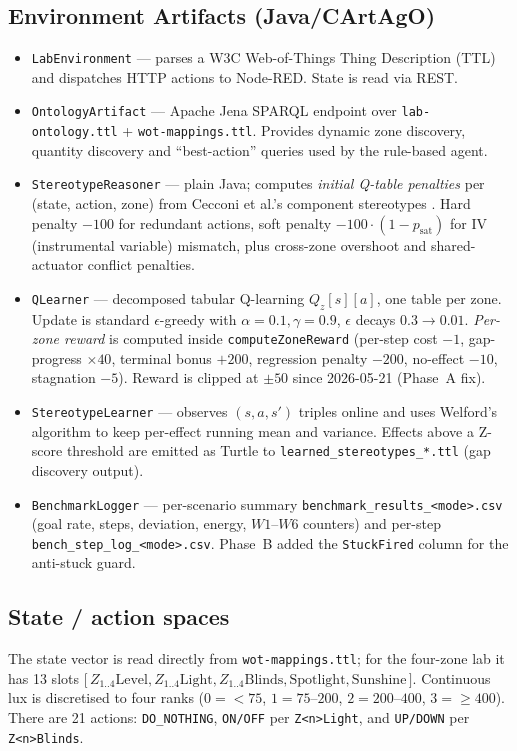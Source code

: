 \documentclass[conference]{IEEEtran}
\begin{document}
\subsection{Environment Artifacts (Java/CArtAgO)}
\begin{itemize}
  \item \texttt{LabEnvironment} --- parses a W3C Web-of-Things Thing
        Description (TTL) and dispatches HTTP actions to Node-RED.
        State is read via REST.
  \item \texttt{OntologyArtifact} --- Apache Jena SPARQL endpoint over
        \verb|lab-ontology.ttl| + \verb|wot-mappings.ttl|. Provides
        dynamic zone discovery, quantity discovery and ``best-action''
        queries used by the rule-based agent.
  \item \texttt{StereotypeReasoner} --- plain Java; computes
        \emph{initial Q-table penalties} per (state, action, zone)
        from Cecconi et al.'s component stereotypes
        \cite{cecconi2023}. Hard penalty $-100$ for redundant actions,
        soft penalty $-100\cdot(1-p_{\text{sat}})$ for IV (instrumental
        variable) mismatch, plus cross-zone overshoot and shared-actuator
        conflict penalties.
  \item \texttt{QLearner} --- decomposed tabular Q-learning
        \(Q_z[s][a]\), one table per zone. Update is standard
        $\epsilon$-greedy with $\alpha=0.1,\gamma=0.9$, $\epsilon$ decays
        $0.3 \to 0.01$. \emph{Per-zone reward} is computed inside
        \verb|computeZoneReward| (per-step cost $-1$, gap-progress
        $\times 40$, terminal bonus $+200$, regression penalty $-200$,
        no-effect $-10$, stagnation $-5$). Reward is clipped at
        $\pm 50$ since 2026-05-21 (Phase~A fix).
  \item \texttt{StereotypeLearner} --- observes
        $(s,a,s')$ triples online and uses Welford's algorithm to keep
        per-effect running mean and variance. Effects above a
        Z-score threshold are emitted as Turtle to
        \verb|learned_stereotypes_*.ttl| (gap discovery output).
  \item \texttt{BenchmarkLogger} --- per-scenario summary
        \verb|benchmark_results_<mode>.csv| (goal rate, steps,
        deviation, energy, $W1$--$W6$ counters) and per-step
        \verb|bench_step_log_<mode>.csv|. Phase~B added the
        \verb|StuckFired| column for the anti-stuck guard.
\end{itemize}

\subsection{State / action spaces}
The state vector is read directly from \verb|wot-mappings.ttl|; for the
four-zone lab it has 13 slots
$\bigl[\,Z_{1..4}\text{Level},
       Z_{1..4}\text{Light},
       Z_{1..4}\text{Blinds},
       \text{Spotlight},
       \text{Sunshine}\,\bigr]$.
Continuous lux is discretised to four ranks ($0\!=\!<\!75$,
$1\!=\!75\text{--}200$, $2\!=\!200\text{--}400$, $3\!=\!\geq 400$).
There are 21 actions: \verb|DO_NOTHING|, \verb|ON/OFF| per
\verb|Z<n>Light|, and \verb|UP/DOWN| per \verb|Z<n>Blinds|.
\end{document}

